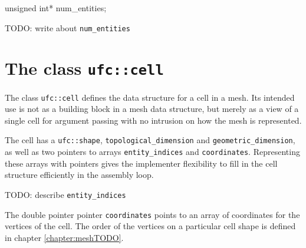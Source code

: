 
\begin{code}
unsigned int* num_entities;
\end{code}

TODO: write about \texttt{num\_entities}


\section{The class \texttt{ufc::cell}}

The class \texttt{ufc::cell} defines the data structure for a cell in a mesh.
Its intended use is not as a building block in a mesh data structure, but merely as a view
of a single cell for argument passing with no intrusion on how the mesh is represented.










The cell has a \texttt{ufc::shape}, \texttt{topological\_dimension} and \texttt{geometric\_dimension},
as well as two pointers to arrays \texttt{entity\_indices} and \texttt{coordinates}.
Representing these arrays with pointers gives the implementer flexibility
to fill in the cell structure efficiently in the assembly loop.

TODO: describe 
\texttt{entity\_indices}

The double pointer pointer \texttt{coordinates} points to an array of coordinates for the vertices of the cell.
The order of the vertices on a particular cell shape is defined in chapter \ref{chapter:meshTODO}.


